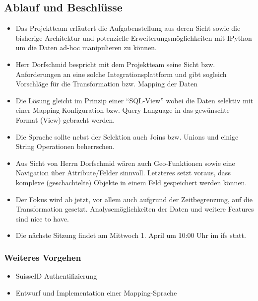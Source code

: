 \documentclass[class=scrbook,crop=false]{standalone}
\begin{document}
	\subsection*{Ablauf und Beschlüsse}
	\begin{itemize}
		\item Das Projektteam erläutert die Aufgabenstellung aus deren Sicht sowie die bisherige Architektur und potenzielle Erweiterungsmöglichkeiten mit IPython um die Daten ad-hoc manipulieren zu können.
		\item Herr Dorfschmid bespricht mit dem Projektteam seine Sicht bzw. Anforderungen an eine solche Integrationsplattform und gibt sogleich Vorschläge für die Transformation bzw. Mapping der Daten
		\item Die Lösung gleicht im Prinzip einer ``SQL-View'' wobei die Daten selektiv mit einer Mapping-Konfiguration bzw. Query-Language in das gewünschte Format (View) gebracht werden.
		\item Die Sprache sollte nebst der Selektion auch Joins bzw. Unions und einige String Operationen beherrschen.
		\item Aus Sicht von Herrn Dorfschmid wären auch Geo-Funktionen sowie eine Navigation über Attribute/Felder sinnvoll. Letzteres setzt voraus, dass komplexe (geschachtelte) Objekte in einem Feld gespeichert werden können.
		\item Der Fokus wird ab jetzt, vor allem auch aufgrund der Zeitbegrenzung, auf die Transformation gesetzt. Analysemöglichkeiten der Daten und weitere Features sind nice to have.
		\item Die nächste Sitzung findet am Mittwoch 1. April um 10:00 Uhr im \acs{ifs} statt.
	\end{itemize}
	
	\subsubsection*{Weiteres Vorgehen}
	\begin{itemize}
		\item SuisseID Authentifizierung
		\item Entwurf und Implementation einer Mapping-Sprache
	\end{itemize}
\end{document}
